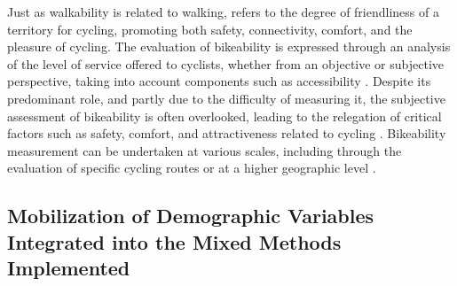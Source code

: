 \begin{refsegment}
Just as \gls{walkability} is related to walking,  refers to the degree of friendliness of a territory for cycling, promoting both safety, connectivity, comfort, and the pleasure of cycling. The evaluation of bikeability is expressed through an analysis of the level of service offered to cyclists, whether from an objective or subjective perspective, taking into account components such as accessibility \textcolor{blue}{\autocite[43]{lowry_assessment_2012}}. Despite its predominant role, and partly due to the difficulty of measuring it, the subjective assessment of bikeability is often overlooked, leading to the relegation of critical factors such as safety, comfort, and attractiveness related to cycling \textcolor{blue}{\autocite[173]{gan_associations_2021}}. Bikeability measurement can be undertaken at various scales, including through the evaluation of specific cycling routes \textcolor{blue}{\autocites[5]{hardinghaus_more_2021}[44]{lowry_assessment_2012}[454]{krenn_development_2015}[55]{mcneil_bikeability_2011}[5]{wysling_where_2022}[6]{schmid-querg_munich_2021}} or at a higher geographic level \textcolor{blue}{\autocites[4]{winters_bike_2016}[68]{gu_using_2018}[38]{nielsen_bikeability_2018}}. %

\subsection{Mobilization of Demographic Variables Integrated into the Mixed Methods Implemented
    \label{chap4:materiau-empirique-genre}
    }


\end{refsegment}
